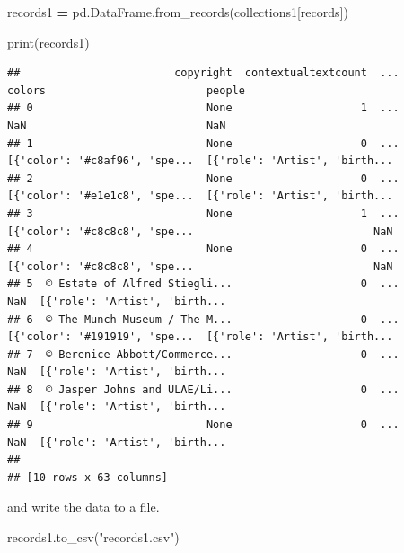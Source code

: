 \documentclass[
]{book}
\newenvironment{Shaded}{\begin{snugshade}}{\end{snugshade}}
\newcommand{\BuiltInTok}[1]{#1}
\newcommand{\NormalTok}[1]{#1}
\newcommand{\OperatorTok}[1]{\textcolor[rgb]{0.81,0.36,0.00}{\textbf{#1}}}
\newcommand{\StringTok}[1]{\textcolor[rgb]{0.31,0.60,0.02}{#1}}
\begin{document}
\begin{Shaded}
\begin{Highlighting}[]
\NormalTok{records1 }\OperatorTok{=}\NormalTok{ pd.DataFrame.from\_records(collections1[}\StringTok{\textquotesingle{}records\textquotesingle{}}\NormalTok{])}
\end{Highlighting}
\end{Shaded}

\begin{Shaded}
\begin{Highlighting}[]
\BuiltInTok{print}\NormalTok{(records1)}
\end{Highlighting}
\end{Shaded}

\begin{verbatim}
##                        copyright  contextualtextcount  ...                         colors                         people
## 0                           None                    1  ...                            NaN                            NaN
## 1                           None                    0  ...  [{'color': '#c8af96', 'spe...  [{'role': 'Artist', 'birth...
## 2                           None                    0  ...  [{'color': '#e1e1c8', 'spe...  [{'role': 'Artist', 'birth...
## 3                           None                    1  ...  [{'color': '#c8c8c8', 'spe...                            NaN
## 4                           None                    0  ...  [{'color': '#c8c8c8', 'spe...                            NaN
## 5  © Estate of Alfred Stiegli...                    0  ...                            NaN  [{'role': 'Artist', 'birth...
## 6  © The Munch Museum / The M...                    0  ...  [{'color': '#191919', 'spe...  [{'role': 'Artist', 'birth...
## 7  © Berenice Abbott/Commerce...                    0  ...                            NaN  [{'role': 'Artist', 'birth...
## 8  © Jasper Johns and ULAE/Li...                    0  ...                            NaN  [{'role': 'Artist', 'birth...
## 9                           None                    0  ...                            NaN  [{'role': 'Artist', 'birth...
## 
## [10 rows x 63 columns]
\end{verbatim}

and write the data to a file.

\begin{Shaded}
\begin{Highlighting}[]
\NormalTok{records1.to\_csv(}\StringTok{"records1.csv"}\NormalTok{)}
\end{Highlighting}
\end{Shaded}
\end{document}
